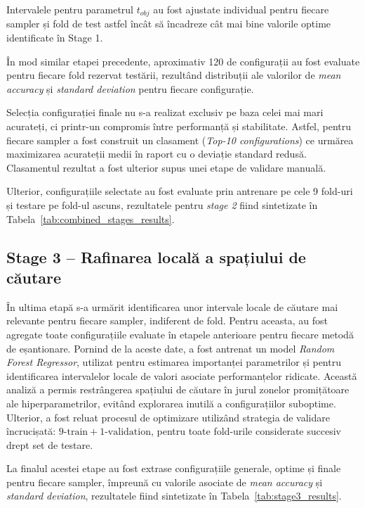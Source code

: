 Intervalele pentru parametrul $t_{obj}$ au fost ajustate individual pentru fiecare sampler și fold de test astfel încât să încadreze cât mai bine valorile optime identificate în Stage 1.

În mod similar etapei precedente, aproximativ 120 de configurații au fost evaluate pentru fiecare fold rezervat testării, rezultând distribuții ale valorilor de \textit{mean accuracy} și \textit{standard deviation} pentru fiecare configurație.

Selecția configurației finale nu s-a realizat exclusiv pe baza celei mai mari acurateți, ci printr-un compromis între performanță și stabilitate. Astfel, pentru fiecare sampler a fost construit un clasament (\textit{Top-10 configurations}) ce urmărea maximizarea acurateții medii în raport cu o deviație standard redusă. Clasamentul rezultat a fost ulterior supus unei etape de validare manuală.

Ulterior, configurațiile selectate au fost evaluate prin antrenare pe cele 9 fold-uri și testare pe fold-ul ascuns, rezultatele pentru \textit{stage 2} fiind sintetizate în Tabela~\ref{tab:combined_stages_results}.

\subsection*{Stage 3 -- Rafinarea locală a spațiului de căutare}

În ultima etapă s-a urmărit identificarea unor intervale locale de căutare mai relevante pentru fiecare sampler, indiferent de fold. Pentru aceasta, au fost agregate toate configurațiile evaluate în etapele anterioare pentru fiecare metodă de eșantionare. Pornind de la aceste date, a fost antrenat un model \textit{Random Forest Regressor}, utilizat pentru estimarea importanței parametrilor și pentru identificarea intervalelor locale de valori asociate performanțelor ridicate. Această analiză a permis restrângerea spațiului de căutare în jurul zonelor promițătoare ale hiperparametrilor, evitând explorarea inutilă a configurațiilor suboptime. Ulterior, a fost reluat procesul de optimizare utilizând strategia de validare încrucișată: $9\text{-train} + 1\text{-validation}$, pentru toate fold-urile considerate succesiv drept set de testare.

La finalul acestei etape au fost extrase configurațiile generale, optime și finale pentru fiecare sampler, împreună cu valorile asociate de \textit{mean accuracy} și \textit{standard deviation}, rezultatele fiind sintetizate în Tabela~\ref{tab:stage3_results}.


